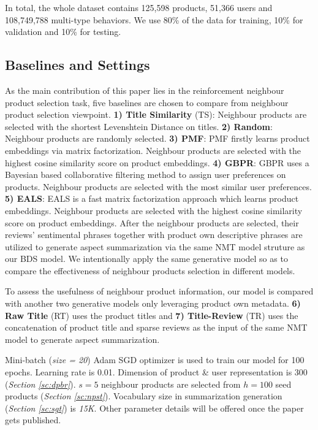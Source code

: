 In total, the whole dataset contains 125,598 products, 51,366 users and 108,749,788 multi-type behaviors. We use 80\% of the data for training, 10\% for validation and 10\% for testing.  


\subsection{Baselines and Settings} \label{sc:baseline}

As the main contribution of this paper lies in the reinforcement neighbour product selection task, five baselines are chosen to compare from neighbour product selection viewpoint. \textbf{1) Title Similarity} (TS): Neighbour products are selected with the shortest Levenshtein Distance on titles. \textbf{2) Random}: Neighbour products are randomly selected. \textbf{3) PMF}: PMF \cite{mnih2008probabilistic}  firstly learns product embeddings via matrix factorization. Neighbour products are selected with the highest cosine similarity score on product embeddings. \textbf{4) GBPR}: GBPR \cite{pan2013gbpr} uses a Bayesian based collaborative filtering method to assign user preferences on products. Neighbour products are selected with the most similar user preferences. \textbf{5) EALS}: EALS \cite{he2016fast} is a fast matrix factorization approach which learns product embeddings. Neighbour products are selected with the highest cosine similarity score on product embeddings. After the neighbour products are selected, their reviews' sentimental phrases together with product own descriptive phrases are utilized to generate aspect summarization via the same NMT model struture  as our BDS model. We intentionally apply the same generative model so as to compare the effectiveness of neighbour products selection in different models.

To assess the usefulness of neighbour product information, our model is compared with another two generative models only leveraging product own  metadata. \textbf{6) Raw Title} (RT) uses the product titles and  \textbf{7) Title-Review} (TR) uses the concatenation of product title and sparse reviews as the input of the same NMT model to generate aspect summarization.
 

Mini-batch (\textit{size = 20}) Adam SGD optimizer is used to train our model for 100 epochs. Learning rate is 0.01. Dimension of product \& user representation is 300 (\textit{Section \ref{sc:dpbr}}). $s=5$ neighbour products are selected from $h=100$ seed products (\textit{Section \ref{sc:npst}}). Vocabulary size in summarization generation (\textit{Section \ref{sc:sgt}}) is \textit{15K}. Other parameter details will be offered once the paper gets published.


